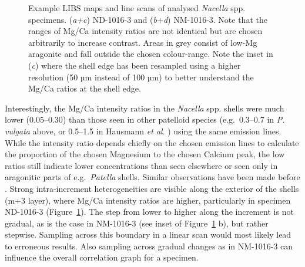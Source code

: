 \documentclass[
  authoryear,
  preprint,
  3p]{elsarticle}
\begin{document}
\begin{figure}[H]


\caption{\label{fig-Nac_LIBS}Example LIBS maps and line scans of
analysed \emph{Nacella} spp. specimens. (\emph{a+c}) ND-1016-3 and
(\emph{b}+\emph{d}) NM-1016-3. Note that the ranges of Mg/Ca intensity
ratios are not identical but are chosen arbitrarily to increase
contrast. Areas in grey consist of low-Mg aragonite and fall outside the
chosen colour-range. Note the inset in (\emph{c}) where the shell edge
has been resampled using a higher resolution (50 µm instead of 100 µm)
to better understand the Mg/Ca ratios at the shell edge.}

\end{figure}%

Interestingly, the Mg/Ca intensity ratios in the \emph{Nacella} spp.
shells were much lower (0.05--0.30) than those seen in other patelloid
species (e.g.~0.3--0.7 in \emph{P. vulgata} above, or 0.5--1.5 in
Hausmann \emph{et al}. \citeyearpar{Hausmann2023-ih}) using the same
emission lines. While the intensity ratio depends chiefly on the chosen
emission lines to calculate the proportion of the chosen Magnesium to
the chosen Calcium peak, the low ratios still indicate lower
concentrations than seen elsewhere or seen only in aragonitic parts of
e.g.~\emph{Patella} shells. Similar observations have been made before
\citep{Graniero2017-io}. Strong intra-increment heterogeneities are
visible along the exterior of the shells (m+3 layer), where Mg/Ca
intensity ratios are higher, particularly in specimen ND-1016-3
(Figure~\ref{fig-Nac_LIBS}). The step from lower to higher along the
increment is not gradual, as is the case in NM-1016-3 (see inset of
Figure~\ref{fig-Nac_LIBS} b), but rather stepwise. Sampling across this
boundary in a linear scan would most likely lead to erroneous results.
Also sampling across gradual changes as in NM-1016-3 can influence the
overall correlation graph for a specimen.
\end{document}
